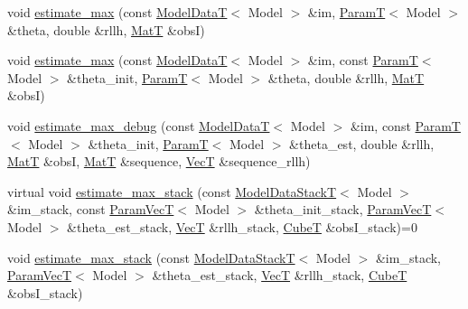 \begin{DoxyCompactItemize}
void \hyperlink{classmappel_1_1Estimator_a79f2d1c46789fed681985bb670e5ca37}{estimate\+\_\+max} (const \hyperlink{namespacemappel_a97f050df953605381ae9c901c3b125f1}{Model\+DataT}$<$ Model $>$ \&im, \hyperlink{namespacemappel_a667925cb0d6c0e49f2f035cc5a9a6857}{ParamT}$<$ Model $>$ \&theta, double \&rllh, \hyperlink{namespacemappel_a7091ab87c528041f7e2027195fad8915}{MatT} \&obsI)
\item 
void \hyperlink{classmappel_1_1Estimator_a8f85cf26c72c34d0071ccd2f8bb56abd}{estimate\+\_\+max} (const \hyperlink{namespacemappel_a97f050df953605381ae9c901c3b125f1}{Model\+DataT}$<$ Model $>$ \&im, const \hyperlink{namespacemappel_a667925cb0d6c0e49f2f035cc5a9a6857}{ParamT}$<$ Model $>$ \&theta\+\_\+init, \hyperlink{namespacemappel_a667925cb0d6c0e49f2f035cc5a9a6857}{ParamT}$<$ Model $>$ \&theta, double \&rllh, \hyperlink{namespacemappel_a7091ab87c528041f7e2027195fad8915}{MatT} \&obsI)
\item 
void \hyperlink{classmappel_1_1Estimator_a4a581372a320f1c13eeffacf6309911b}{estimate\+\_\+max\+\_\+debug} (const \hyperlink{namespacemappel_a97f050df953605381ae9c901c3b125f1}{Model\+DataT}$<$ Model $>$ \&im, const \hyperlink{namespacemappel_a667925cb0d6c0e49f2f035cc5a9a6857}{ParamT}$<$ Model $>$ \&theta\+\_\+init, \hyperlink{namespacemappel_a667925cb0d6c0e49f2f035cc5a9a6857}{ParamT}$<$ Model $>$ \&theta\+\_\+est, double \&rllh, \hyperlink{namespacemappel_a7091ab87c528041f7e2027195fad8915}{MatT} \&obsI, \hyperlink{namespacemappel_a7091ab87c528041f7e2027195fad8915}{MatT} \&sequence, \hyperlink{namespacemappel_a2225ad69f358daa3f4f99282a35b9a3a}{VecT} \&sequence\+\_\+rllh)
\item 
virtual void \hyperlink{classmappel_1_1Estimator_a50c0cdffa2b5e7c45180a92dd3b34073}{estimate\+\_\+max\+\_\+stack} (const \hyperlink{namespacemappel_aaeb6665bc57476dd93c2df6ad8bc4768}{Model\+Data\+StackT}$<$ Model $>$ \&im\+\_\+stack, const \hyperlink{namespacemappel_a0f86d3153e4e27b095012f140eea58de}{Param\+VecT}$<$ Model $>$ \&theta\+\_\+init\+\_\+stack, \hyperlink{namespacemappel_a0f86d3153e4e27b095012f140eea58de}{Param\+VecT}$<$ Model $>$ \&theta\+\_\+est\+\_\+stack, \hyperlink{namespacemappel_a2225ad69f358daa3f4f99282a35b9a3a}{VecT} \&rllh\+\_\+stack, \hyperlink{namespacemappel_ab2afab4e6c8805e83946670d882768c2}{CubeT} \&obs\+I\+\_\+stack)=0
\item 
void \hyperlink{classmappel_1_1Estimator_aa1b1c2677df2c6ea9fcf67b6a0856e46}{estimate\+\_\+max\+\_\+stack} (const \hyperlink{namespacemappel_aaeb6665bc57476dd93c2df6ad8bc4768}{Model\+Data\+StackT}$<$ Model $>$ \&im\+\_\+stack, \hyperlink{namespacemappel_a0f86d3153e4e27b095012f140eea58de}{Param\+VecT}$<$ Model $>$ \&theta\+\_\+est\+\_\+stack, \hyperlink{namespacemappel_a2225ad69f358daa3f4f99282a35b9a3a}{VecT} \&rllh\+\_\+stack, \hyperlink{namespacemappel_ab2afab4e6c8805e83946670d882768c2}{CubeT} \&obs\+I\+\_\+stack)

\end{DoxyCompactItemize}
